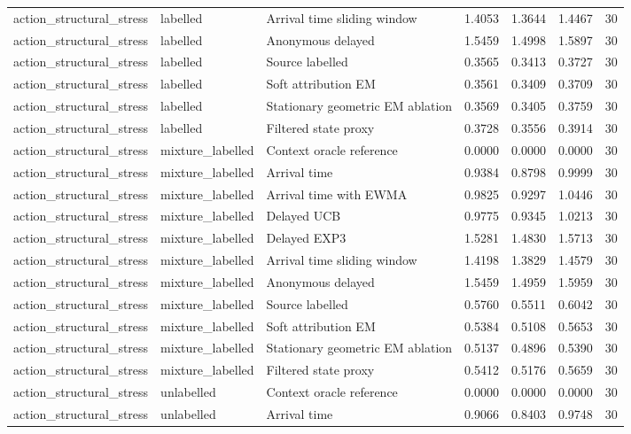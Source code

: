 \begin{tabular}{llllllr}
action\_structural\_stress & labelled & Arrival time sliding window & 1.4053 & 1.3644 & 1.4467 & 30 \\
action\_structural\_stress & labelled & Anonymous delayed & 1.5459 & 1.4998 & 1.5897 & 30 \\
action\_structural\_stress & labelled & Source labelled & 0.3565 & 0.3413 & 0.3727 & 30 \\
action\_structural\_stress & labelled & Soft attribution EM & 0.3561 & 0.3409 & 0.3709 & 30 \\
action\_structural\_stress & labelled & Stationary geometric EM ablation & 0.3569 & 0.3405 & 0.3759 & 30 \\
action\_structural\_stress & labelled & Filtered state proxy & 0.3728 & 0.3556 & 0.3914 & 30 \\
action\_structural\_stress & mixture\_labelled & Context oracle reference & 0.0000 & 0.0000 & 0.0000 & 30 \\
action\_structural\_stress & mixture\_labelled & Arrival time & 0.9384 & 0.8798 & 0.9999 & 30 \\
action\_structural\_stress & mixture\_labelled & Arrival time with EWMA & 0.9825 & 0.9297 & 1.0446 & 30 \\
action\_structural\_stress & mixture\_labelled & Delayed UCB & 0.9775 & 0.9345 & 1.0213 & 30 \\
action\_structural\_stress & mixture\_labelled & Delayed EXP3 & 1.5281 & 1.4830 & 1.5713 & 30 \\
action\_structural\_stress & mixture\_labelled & Arrival time sliding window & 1.4198 & 1.3829 & 1.4579 & 30 \\
action\_structural\_stress & mixture\_labelled & Anonymous delayed & 1.5459 & 1.4959 & 1.5959 & 30 \\
action\_structural\_stress & mixture\_labelled & Source labelled & 0.5760 & 0.5511 & 0.6042 & 30 \\
action\_structural\_stress & mixture\_labelled & Soft attribution EM & 0.5384 & 0.5108 & 0.5653 & 30 \\
action\_structural\_stress & mixture\_labelled & Stationary geometric EM ablation & 0.5137 & 0.4896 & 0.5390 & 30 \\
action\_structural\_stress & mixture\_labelled & Filtered state proxy & 0.5412 & 0.5176 & 0.5659 & 30 \\
action\_structural\_stress & unlabelled & Context oracle reference & 0.0000 & 0.0000 & 0.0000 & 30 \\
action\_structural\_stress & unlabelled & Arrival time & 0.9066 & 0.8403 & 0.9748 & 30 \\

\end{tabular}
